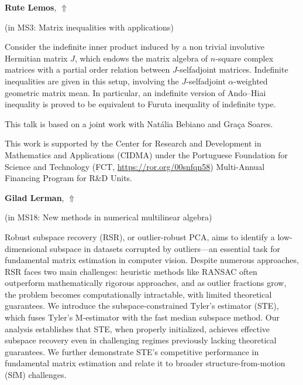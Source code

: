 \documentclass[ILAS2025-program.tex]{subfiles}
\begin{document}
\hypertarget{down0265}{}\begin{ilasabstract}
    
\textbf{Rute Lemos},  \hfill \hyperlink{up0265}{$\Uparrow$}
    
    
(in {\color{mstitle}MS3: Matrix inequalities with applications})
        
\mtskip
    Consider the indefinite inner product induced by a non trivial involutive Hermitian matrix $J$, 
which endows the matrix algebra of $n$-square complex matrices with a partial order relation between $J$-selfadjoint matrices.
Indefinite inequalities are given in this setup, involving the $J$-selfadjoint $\alpha$-weighted geometric matrix mean. 
In particular, an indefinite version of Ando–Hiai inequality is proved to be equivalent to Furuta inequality of indefinite type.

This talk is based on a joint work with Nat\'alia Bebiano and Gra\c ca Soares.

This work is supported by the
Center for Research and Development in Mathematics and Applications (CIDMA) under the
Portuguese Foundation for Science and Technology 
(FCT, \url{https://ror.org/00snfqn58})   
Multi-Annual Financing Program for R\&D Units.
\end{ilasabstract}
    

\hypertarget{down0147}{}\begin{ilasabstract}
    
\textbf{Gilad Lerman},  \hfill \hyperlink{up0147}{$\Uparrow$}
    
    
(in {\color{mstitle}MS18: New methods in numerical multilinear algebra})
        
\mtskip
    Robust subspace recovery (RSR), or outlier-robust PCA, aims to identify a low-dimensional subspace in datasets corrupted by outliers—an essential task for fundamental matrix estimation in computer vision. Despite numerous approaches, RSR faces two main challenges: heuristic methods like RANSAC often outperform mathematically rigorous approaches, and as outlier fractions grow, the problem becomes computationally intractable, with limited theoretical guarantees. We introduce the subspace-constrained Tyler's estimator (STE), which fuses Tyler's M-estimator with the fast median subspace method. Our analysis establishes that STE, when properly initialized, achieves effective subspace recovery even in challenging regimes previously lacking theoretical guarantees. We further demonstrate STE's competitive performance in fundamental matrix estimation and relate it to broader structure-from-motion (SfM) challenges. 

\end{ilasabstract}
    
\end{document}
